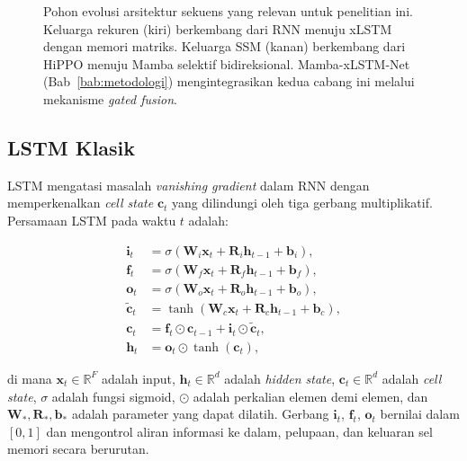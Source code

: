 \begin{figure}[ht]
{%
  }
  \caption{Pohon evolusi arsitektur sekuens yang relevan untuk penelitian ini.
           Keluarga rekuren (kiri) berkembang dari RNN menuju xLSTM dengan memori
           matriks. Keluarga SSM (kanan) berkembang dari HiPPO menuju Mamba
           selektif bidireksional. Mamba-xLSTM-Net (Bab~\ref{bab:metodologi})
           mengintegrasikan kedua cabang ini melalui mekanisme \emph{gated fusion}.}
  \label{fig:bab3_evolusi_seq}
\end{figure}

\subsection{LSTM Klasik}
\label{subsec:bab3_lstm}

LSTM  mengatasi masalah \emph{vanishing gradient}
dalam RNN dengan memperkenalkan \emph{cell state} $\mathbf{c}_t$ yang dilindungi
oleh tiga gerbang multiplikatif. Persamaan LSTM pada waktu $t$ adalah:

\begin{align}
  \mathbf{i}_t &= \sigma(\mathbf{W}_i \mathbf{x}_t + \mathbf{R}_i \mathbf{h}_{t-1}
    + \mathbf{b}_i), \label{eq:bab3_lstm_i} \\
  \mathbf{f}_t &= \sigma(\mathbf{W}_f \mathbf{x}_t + \mathbf{R}_f \mathbf{h}_{t-1}
    + \mathbf{b}_f), \label{eq:bab3_lstm_f} \\
  \mathbf{o}_t &= \sigma(\mathbf{W}_o \mathbf{x}_t + \mathbf{R}_o \mathbf{h}_{t-1}
    + \mathbf{b}_o), \label{eq:bab3_lstm_o} \\
  \tilde{\mathbf{c}}_t &= \tanh(\mathbf{W}_c \mathbf{x}_t + \mathbf{R}_c
    \mathbf{h}_{t-1} + \mathbf{b}_c), \label{eq:bab3_lstm_ctilde} \\
  \mathbf{c}_t &= \mathbf{f}_t \odot \mathbf{c}_{t-1}
    + \mathbf{i}_t \odot \tilde{\mathbf{c}}_t, \label{eq:bab3_lstm_c} \\
  \mathbf{h}_t &= \mathbf{o}_t \odot \tanh(\mathbf{c}_t), \label{eq:bab3_lstm_h}
\end{align}

\noindent di mana $\mathbf{x}_t \in \mathbb{R}^F$ adalah input, $\mathbf{h}_t
\in \mathbb{R}^d$ adalah \emph{hidden state}, $\mathbf{c}_t \in \mathbb{R}^d$
adalah \emph{cell state}, $\sigma$ adalah fungsi sigmoid, $\odot$ adalah
perkalian elemen demi elemen, dan $\mathbf{W}_*, \mathbf{R}_*, \mathbf{b}_*$
adalah parameter yang dapat dilatih. Gerbang $\mathbf{i}_t$, $\mathbf{f}_t$,
$\mathbf{o}_t$ bernilai dalam $[0, 1]$ dan mengontrol aliran informasi ke
dalam, pelupaan, dan keluaran sel memori secara berurutan.

